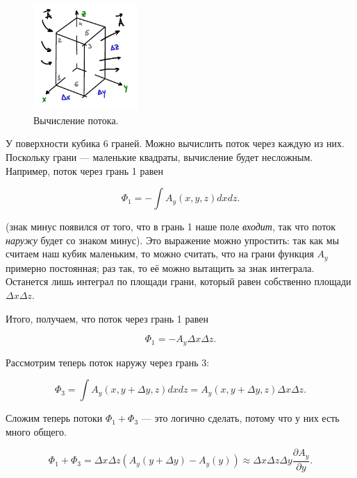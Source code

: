 \documentclass[12pt,a4paper]{article}
\numberwithin{equation}{section}
\numberwithin{equation}{section}
\newcommand{\pt}{\partial}
\begin{document}
\begin{figure}
  \begin{center}
    \includegraphics[width=4cm,height=4cm]{div.pdf}
  \end{center}
  \vspace{-0.7cm}
  \caption{Вычисление потока.}
  \label{fig:div}
  \vspace{2cm}
\end{figure}

У поверхности кубика 6 граней. Можно вычислить поток через каждую из
них. Поскольку грани --- маленькие квадраты, вычисление будет
несложным. Например, поток через грань 1 равен

\begin{equation}
  \label{eq:theorem_divergence_1}
  \Phi_1 = -\int A_y (x,y,z) dx dz.
\end{equation}

(знак минус появился от того, что в грань 1 наше поле \emph{входит},
так что поток \emph{наружу} будет со знаком минус). Это выражение
можно упростить: так как мы считаем наш кубик маленьким, то можно
считать, что на грани функция $A_y$ примерно постоянная; раз так, то
её можно вытащить за знак интеграла. Останется лишь интеграл по
площади грани, который равен собственно площади $\Delta x \Delta z$. 

Итого, получаем, что поток через грань 1 равен

\begin{equation}
  \Phi_1 = - A_y \Delta x \Delta z. 
\end{equation}

Рассмотрим теперь поток наружу через грань 3:

\begin{equation}
  \Phi_3 = \int A_y (x,y + \Delta y,z) dx dz = A_y (x,y+\Delta y,z)
  \Delta x \Delta z.
\end{equation}

Сложим теперь потоки $\Phi_1 + \Phi_3$ --- это логично сделать, потому
что у них есть много общего. 

\begin{equation}
  \label{eq:theorem_divergence_2}
  \Phi_1 + \Phi_3 = \Delta x \Delta z \left(A_y(y+\Delta y) - A_y
    (y)\right) \approx \Delta x \Delta z \Delta y \frac{\pt A_y}{\pt y}.
\end{equation}
\end{document}
